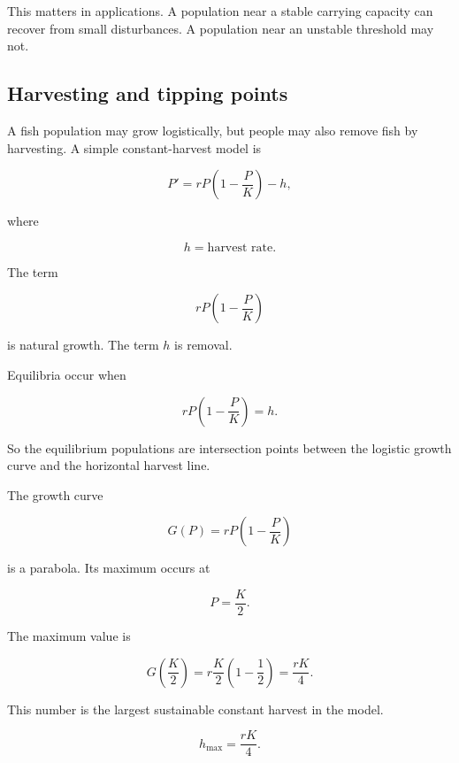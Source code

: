 This matters in applications.  A population near a stable carrying capacity can recover
from small disturbances.  A population near an unstable threshold may not.

\subsection{Harvesting and tipping points}
\label{subsec:harvesting-tipping-points}

A fish population may grow logistically, but people may also remove fish by harvesting.
A simple constant-harvest model is

\[
\boxed{
P'=rP\left(1-\frac{P}{K}\right)-h,
}
\]

where

\[
h=\text{harvest rate}.
\]

The term

\[
rP\left(1-\frac{P}{K}\right)
\]

is natural growth.  The term \(h\) is removal.

Equilibria occur when

\[
rP\left(1-\frac{P}{K}\right)=h.
\]

So the equilibrium populations are intersection points between the logistic growth curve
and the horizontal harvest line.

The growth curve

\[
G(P)=rP\left(1-\frac{P}{K}\right)
\]

is a parabola.  Its maximum occurs at

\[
P=\frac K2.
\]

The maximum value is

\[
G\left(\frac K2\right)
=
r\frac K2\left(1-\frac12\right)
=
\boxed{\frac{rK}{4}}.
\]

This number is the largest sustainable constant harvest in the model.

\[
\boxed{
h_{\max}=\frac{rK}{4}.
}
\]

